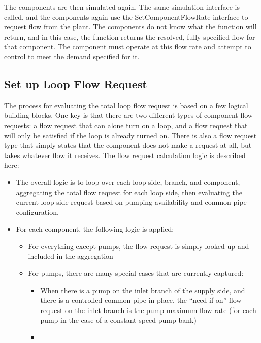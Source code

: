 \documentclass{report}
\begin{document}
            The components are then simulated again.
            The same simulation interface is called, and the components again use the SetComponentFlowRate interface to request flow from the plant.
            The components do not know what the function will return, and in this case, the function returns the resolved, fully specified flow for that component.
            The component must operate at this flow rate and attempt to control to meet the demand specified for it.

            \subsection{Set up Loop Flow Request}\label{subsec:modeling-flow-request}

                The process for evaluating the total loop flow request is based on a few logical building blocks.
                One key is that there are two different types of component flow requests: a flow request that can alone turn on a loop, and a flow request that will only be satisfied if the loop is already turned on.
                There is also a flow request type that simply states that the component does not make a request at all, but takes whatever flow it receives.
                The flow request calculation logic is described here:

                \begin{itemize}
                    \item The overall logic is to loop over each loop side, branch, and component, aggregating the total flow request for each loop side, then evaluating the current loop side request based on pumping availability and common pipe configuration.
                    \item For each component, the following logic is applied:
                    \begin{itemize}
                        \item For everything except pumps, the flow request is simply looked up and included in the aggregation
                        \item For pumps, there are many special cases that are currently captured:
                        \begin{itemize}
                            \item When there is a pump on the inlet branch of the supply side, and there is a controlled common pipe in place, the ``need-if-on'' flow request on the inlet branch is the pump maximum flow rate (for each pump in the case of a constant speed pump bank)
                            \item
                        \end{itemize}
                    \end{itemize}
                \end{itemize}
\end{document}
